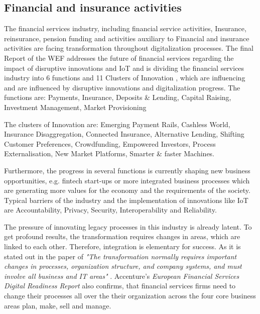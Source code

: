 \subsection{Financial and insurance activities}

The financial services industry, including financial service activities, Insurance, reinsurance, pension funding and activities auxiliary to Financial and insurance activities \citeauthor{ISIC:2008} are facing transformation throughout digitalization processes. The final Report of the \ac{WEF} addresses the future of financial services regarding the impact of disruptive innovations and \ac{IoT} \cite{WEF-futureFinancialServices} and is dividing the financial services industry into 6 functions and 11 Clusters of Innovation \cite{WEF-futureFinancialServices}, which are influencing and are influenced by disruptive innovations and digitalization progress.
The functions are:
Payments, Insurance, Deposits \& Lending, Capital Raising, Investment Management, Market Provisioning

The clusters of Innovation are:
Emerging Payment Rails, Cashless World, Insurance Disaggregation, Connected Insurance, Alternative Lending, Shifting Customer Preferences, Crowdfunding, Empowered Investors, Process Externalisation, New Market Platforms, Smarter \& faster Machines.

Furthermore, the progress in several functions is currently shaping new business opportunities, e.g. fintech start-ups or more integrated business processes which are generating more values for the economy and the requirements of the society.
Typical barriers of the industry and the implementation of innovations like \ac{IoT} are Accountability, Privacy, Security, Interoperability and Reliability. \cite{WEF-futureFinancialServices, Weber2011133, CapGemini-IoT-financialServices} %

The pressure of innovating legacy processes in this industry is already latent. To get profound results, the transformation requires changes in areas, which are linked to each other. Therefore, integration is elementary for success. As it is stated out in the paper of \citeauthor{ArthurDLittle-FinancialService} \emph{"The transformation normally requires important changes in processes, organization structure, and company systems, and must involve all business and IT areas"} \cite[p.4 ]{ArthurDLittle-FinancialService}. Accenture's \emph{European Financial Services Digital Readiness Report} also confirms, that financial services firms need to change their processes all over the their organization across the four core business areas plan, make, sell and manage. \cite[p. 9]{accenture-europeanFinancialServices-digitalReadinessReport}


